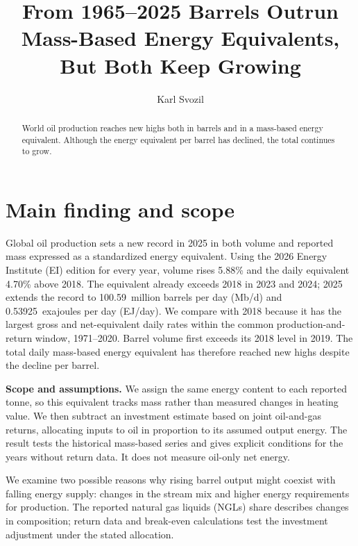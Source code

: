 \documentclass[reprint,aps,pra,longbibliography,floatfix]{revtex4-2}
\begin{document}
\title{From 1965--2025 Barrels Outrun Mass-Based Energy Equivalents, \\But Both Keep Growing}
\author{Karl Svozil }
\begin{abstract}
World oil production reaches new highs both in barrels and in a mass-based energy equivalent. Although the energy equivalent per barrel has declined, the total continues to grow.
\end{abstract}
\maketitle

\section{Main finding and scope}
Global oil production sets a new record in 2025 in both volume and reported mass expressed as a standardized energy equivalent. Using the 2026 Energy Institute (EI) edition for every year, volume rises 5.88\% and the daily equivalent 4.70\% above 2018. The equivalent already exceeds 2018 in 2023 and 2024; 2025 extends the record to 100.59~million barrels per day (Mb/d) and 0.53925~exajoules per day (EJ/day). We compare with 2018 because it has the largest gross and net-equivalent daily rates within the common production-and-return window, 1971--2020. Barrel volume first exceeds its 2018 level in 2019. The total daily mass-based energy equivalent has therefore reached new highs despite the decline per barrel.

\textbf{Scope and assumptions.} We assign the same energy content to each reported tonne, so this equivalent tracks mass rather than measured changes in heating value. We then subtract an investment estimate based on joint oil-and-gas returns, allocating inputs to oil in proportion to its assumed output energy. The result tests the historical mass-based series and gives explicit conditions for the years without return data. It does not measure oil-only net energy.

We examine two possible reasons why rising barrel output might coexist with falling energy supply: changes in the stream mix and higher energy requirements for production. The reported natural gas liquids (NGLs) share describes changes in composition; return data and break-even calculations test the investment adjustment under the stated allocation.
\end{document}

